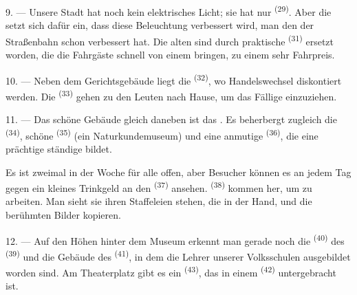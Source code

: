 \VUsaut{4.0mm}
\VUsaut{3.4mm}

9. --- Unsere Stadt hat noch kein elektrisches Licht; sie hat nur
 \textsuperscript{(29)}. Aber die 
setzt sich dafür ein, dass diese Beleuchtung verbessert wird,  man
den  der Straßenbahn schon verbessert hat. Die alten
 sind durch praktische 
\textsuperscript{(31)} ersetzt worden, die die Fahrgäste schnell von einem
 bringen, zu einem sehr 
Fahrpreis.

10. --- Neben dem Gerichtsgebäude liegt die  \textsuperscript{(32)}, wo
Handelswechsel diskontiert werden. Die  \textsuperscript{(33)} gehen
zu den Leuten nach Hause, um das Fällige einzuziehen.

\VUsaut{4.0mm}
\VUsaut{3.4mm}

11. --- Das schöne Gebäude gleich daneben ist das . Es beherbergt
zugleich die  \textsuperscript{(34)}, schöne
 \textsuperscript{(35)} (ein Naturkundemuseum) und
eine anmutige  \textsuperscript{(36)}, die eine prächtige
ständige  bildet.

Es ist zweimal in der Woche für alle offen, aber Besucher können es an jedem Tag
gegen ein kleines Trinkgeld an den  \textsuperscript{(37)} ansehen.
 \textsuperscript{(38)} kommen her, um zu arbeiten. Man sieht sie
 ihren Staffeleien stehen, die  in der Hand, und die
berühmten Bilder kopieren.

12. --- Auf den Höhen hinter dem Museum erkennt man gerade noch die 
\textsuperscript{(40)} des  \textsuperscript{(39)} und die
Gebäude des  \textsuperscript{(41)}, in dem die Lehrer unserer
Volksschulen ausgebildet worden sind. Am Theaterplatz gibt es ein 
\textsuperscript{(43)}, das in einem  \textsuperscript{(42)}
untergebracht ist.

\VUsaut{5.0mm}
\VUsaut{3.0mm}

\VUsaut{3.4mm}

